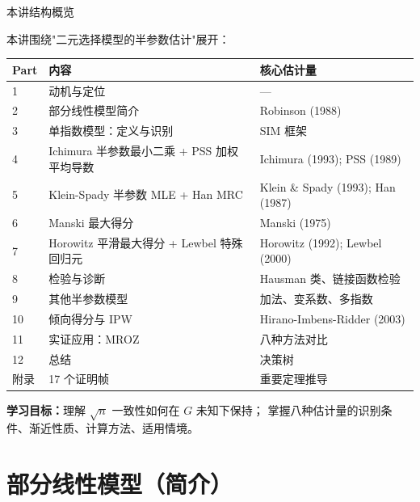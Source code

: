 \documentclass[aspectratio=169, 10pt]{beamer}
\begin{document}
\begin{frame}{本讲结构概览}

  本讲围绕"二元选择模型的半参数估计"展开：

  \begin{center}\scriptsize
  \begin{tabular}{p{1cm}|p{6.5cm}|p{6cm}}
  \hline
  Part & 内容 & 核心估计量 \\
  \hline
  1 & 动机与定位 & — \\
  2 & 部分线性模型简介 & Robinson (1988) \\
  3 & 单指数模型：定义与识别 & SIM 框架 \\
  4 & Ichimura 半参数最小二乘 + PSS 加权平均导数 & Ichimura (1993); PSS (1989) \\
  5 & Klein-Spady 半参数 MLE + Han MRC & Klein \& Spady (1993); Han (1987) \\
  6 & Manski 最大得分 & Manski (1975) \\
  7 & Horowitz 平滑最大得分 + Lewbel 特殊回归元 & Horowitz (1992); Lewbel (2000) \\
  8 & 检验与诊断 & Hausman 类、链接函数检验 \\
  9 & 其他半参数模型 & 加法、变系数、多指数 \\
  10 & 倾向得分与 IPW & Hirano-Imbens-Ridder (2003) \\
  11 & 实证应用：MROZ & 八种方法对比 \\
  12 & 总结 & 决策树 \\
  附录 & 17 个证明帧 & 重要定理推导 \\
  \hline
  \end{tabular}
  \end{center}

  \begin{keybox}
    \textbf{学习目标：}理解 $\sqrt{n}$ 一致性如何在 $G$ 未知下保持；
    掌握八种估计量的识别条件、渐近性质、计算方法、适用情境。
  \end{keybox}

\end{frame}

\section{部分线性模型（简介）}
\end{document}
